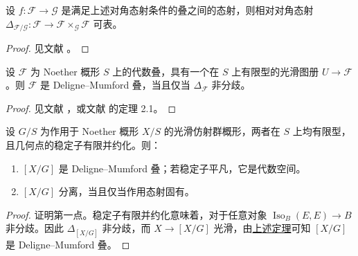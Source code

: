 \begin{lemma}\label{lem:2.5}
设 $f:\mathcal F\to\mathcal G$ 是满足上述对角态射条件的叠之间的态射，则相对对角态射 $\Delta_{\mathcal F/\mathcal G}:\mathcal F\to\mathcal F\times_{\mathcal G}\mathcal F$ 可表。
\end{lemma}
\begin{proof}见文献 \cite{ref20}。\end{proof}
\begin{theorem}\label{thm:2.6}
设 $\mathcal F$ 为 Noether 概形 $S$ 上的代数叠，具有一个在 $S$ 上有限型的光滑图册 $U\to\mathcal F$。则 $\mathcal F$ 是 Deligne–Mumford 叠，当且仅当 $\Delta_{\mathcal F}$ 非分歧。
\end{theorem}
\begin{proof}见文献 \cite{ref20}，或文献 \cite{ref9} 的定理 2.1。\end{proof}
\begin{corollary}\label{cor:2.7}
设 $G/S$ 为作用于 Noether 概形 $X/S$ 的光滑仿射群概形，两者在 $S$ 上均有限型，且几何点的稳定子有限并约化。则：
\begin{enumerate}[label=(\roman*)]
\item $[X/G]$ 是 Deligne–Mumford 叠；若稳定子平凡，它是代数空间。
\item $[X/G]$ 分离，当且仅当作用态射固有。
\end{enumerate}
\end{corollary}
\begin{proof}
证明第一点。稳定子有限并约化意味着，对于任意对象
$\operatorname{Iso}_B(E,E)\to B$ 非分歧。因此 $\Delta_{[X/G]}$ 非分歧，而 $X\to[X/G]$ 光滑，由\hyperref[thm:2.6]{上述定理}可知 $[X/G]$ 是 Deligne–Mumford 叠。
\end{proof}
